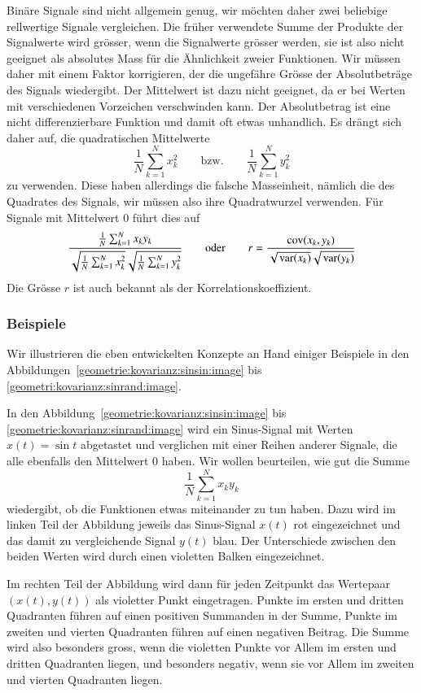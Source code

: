 Binäre Signale sind nicht allgemein genug, wir möchten daher zwei
beliebige rellwertige Signale vergleichen.
Die früher verwendete Summe der Produkte der Signalwerte wird grösser,
wenn die Signalwerte grösser werden, sie ist also nicht geeignet als
absolutes Mass für die Ähnlichkeit zweier Funktionen.
Wir müssen daher mit einem Faktor korrigieren, der die ungefähre
Grösse der Absolutbeträge des Signals wiedergibt.
Der Mittelwert ist dazu nicht geeignet, da er bei Werten mit verschiedenen
Vorzeichen verschwinden kann.
Der Absolutbetrag ist eine nicht differenzierbare Funktion und damit
oft etwas unhandlich.
Es drängt sich daher auf, die quadratischen Mittelwerte
\[
\frac1{N}
\sum_{k=1}^N x_k^2
\qquad\text{bzw.}\qquad
\frac1{N}
\sum_{k=1}^N y_k^2
\]
zu
verwenden.
Diese haben allerdings die falsche Masseinheit, nämlich die des
Quadrates des Signals, wir müssen also ihre Quadratwurzel verwenden.
Für Signale mit Mittelwert $0$ führt dies auf
\[
\frac{
\frac{1}{N}\sum_{k=1}^N x_ky_k
}{
\sqrt{\frac{1}{N}\sum_{k=1}^N x_k^2}
\sqrt{\frac{1}{N}\sum_{k=1}^N y_k^2}
}
\qquad\text{oder}\qquad
r
=
\frac{\operatorname{cov}(x_k,y_k)}{\sqrt{\mathstrut\operatorname{var}(x_k)}\sqrt{\mathstrut\operatorname{var}(y_k)}}
\]
Die Grösse $r$ ist auch bekannt als der Korrelationskoeffizient.
%
%

\subsubsection{Beispiele}
Wir illustrieren die eben entwickelten Konzepte an Hand einiger Beispiele
in den Abbildungen~\ref{geometrie:kovarianz:sinsin:image} bis
\ref{geometri:kovarianz:sinrand:image}.

In den Abbildung~\ref{geometrie:kovarianz:sinsin:image} bis
\ref{geometrie:kovarianz:sinrand:image} wird ein Sinus-Signal
mit Werten $x(t)=\sin t$ abgetastet und verglichen mit
einer Reihen anderer Signale,
die alle ebenfalls den Mittelwert $0$ haben.
Wir wollen beurteilen, wie gut die Summe
\[
\frac{1}{N}\sum_{k=1}^N x_ky_k
\]
wiedergibt, ob die Funktionen etwas miteinander zu tun haben.
Dazu wird im linken Teil der Abbildung jeweils das Sinus-Signal
$x(t)$ rot eingezeichnet und das damit zu vergleichende Signal $y(t)$
blau.
Der Unterschiede zwischen den beiden Werten wird durch einen 
violetten Balken eingezeichnet.

Im rechten Teil der Abbildung wird dann für jeden Zeitpunkt
das Wertepaar $(x(t),y(t))$ als violetter Punkt eingetragen.
Punkte im ersten und dritten Quadranten führen auf einen positiven
Summanden in der Summe, Punkte im zweiten und vierten Quadranten
führen auf einen negativen Beitrag.
Die Summe wird also besonders gross, wenn die violetten Punkte vor
Allem im ersten und dritten Quadranten liegen, und besonders negativ,
wenn sie vor Allem im zweiten und vierten Quadranten liegen.

